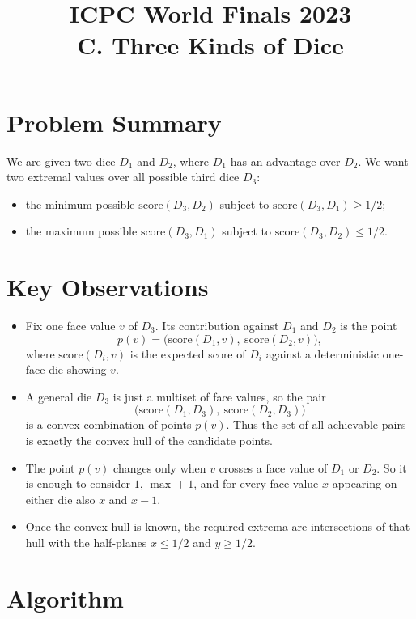 \documentclass[11pt]{article}
\title{ICPC World Finals 2023\\C. Three Kinds of Dice}
\author{}
\date{}
\begin{document}
\maketitle

\section*{Problem Summary}

We are given two dice $D_1$ and $D_2$, where $D_1$ has an advantage over $D_2$. We want two extremal
values over all possible third dice $D_3$:
\begin{itemize}[leftmargin=*]
    \item the minimum possible $\text{score}(D_3,D_2)$ subject to $\text{score}(D_3,D_1)\ge 1/2$;
    \item the maximum possible $\text{score}(D_3,D_1)$ subject to $\text{score}(D_3,D_2)\le 1/2$.
\end{itemize}

\section*{Key Observations}

\begin{itemize}[leftmargin=*]
    \item Fix one face value $v$ of $D_3$. Its contribution against $D_1$ and $D_2$ is the point
    \[
    p(v)=\bigl(\text{score}(D_1,v),\ \text{score}(D_2,v)\bigr),
    \]
    where $\text{score}(D_i,v)$ is the expected score of $D_i$ against a deterministic one-face die
    showing $v$.
    \item A general die $D_3$ is just a multiset of face values, so the pair
    \[
    \bigl(\text{score}(D_1,D_3),\ \text{score}(D_2,D_3)\bigr)
    \]
    is a convex combination of points $p(v)$. Thus the set of all achievable pairs is exactly the convex
    hull of the candidate points.
    \item The point $p(v)$ changes only when $v$ crosses a face value of $D_1$ or $D_2$. So it is enough
    to consider $1$, $\max+1$, and for every face value $x$ appearing on either die also $x$ and $x-1$.
    \item Once the convex hull is known, the required extrema are intersections of that hull with the
    half-planes $x \le 1/2$ and $y \ge 1/2$.
\end{itemize}

\section*{Algorithm}
\end{document}
